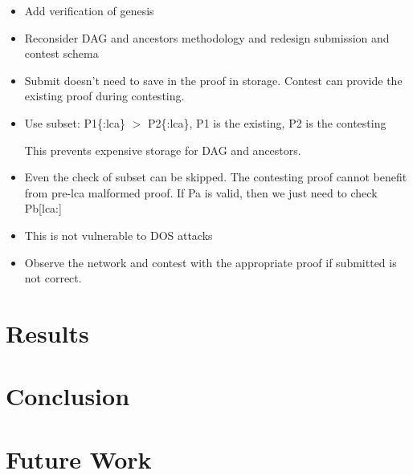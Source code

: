 \documentclass{article}
\begin{document}
  \begin{itemize}

  \item
    Add verification of genesis
  \item
    Reconsider DAG and ancestors methodology and redesign submission and
    contest schema
  \item
    Submit doesn't need to save in the proof in storage. Contest can
    provide the existing proof during contesting.

  \item
    Use subset: P1\{:lca\} $>$ P2\{:lca\}, P1 is the existing, P2 is the
    contesting

    This prevents expensive storage for DAG and ancestors.

  \item
    Even the check of subset can be skipped. The contesting proof cannot
    benefit from pre-lca malformed proof. If Pa is valid, then we just
    need to check Pb[lca:]

  \item
    This is not vulnerable to DOS attacks

  \item
    Observe the network and contest with the appropriate proof if
    submitted is not correct.

  \end{itemize}

  \section{Results}

  \section{Conclusion}

  \section{Future Work}
\end{document}
